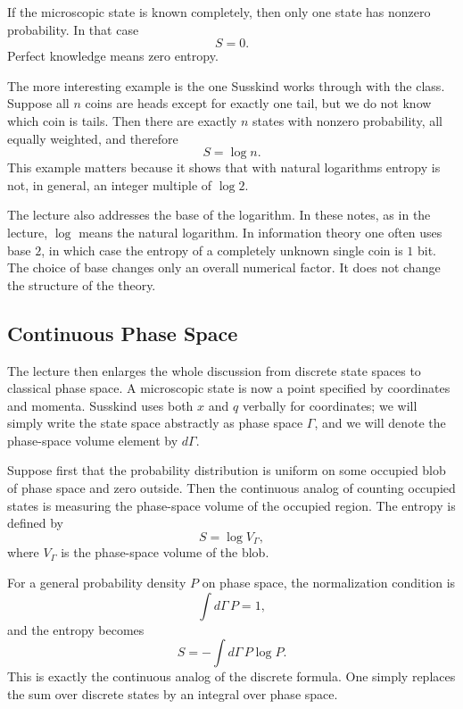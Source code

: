 If the microscopic state is known completely, then only one state has nonzero probability. In that case
\begin{equation}
S=0.
\end{equation}
Perfect knowledge means zero entropy.

The more interesting example is the one Susskind works through with the class. Suppose all \(n\) coins are heads except for exactly one tail, but we do not know which coin is tails. Then there are exactly \(n\) states with nonzero probability, all equally weighted, and therefore
\begin{equation}
S=\log n.
\end{equation}
This example matters because it shows that with natural logarithms entropy is not, in general, an integer multiple of \(\log 2\).

The lecture also addresses the base of the logarithm. In these notes, as in the lecture, \(\log\) means the natural logarithm. In information theory one often uses base \(2\), in which case the entropy of a completely unknown single coin is \(1\) bit. The choice of base changes only an overall numerical factor. It does not change the structure of the theory.

\subsection{Continuous Phase Space}

The lecture then enlarges the whole discussion from discrete state spaces to classical phase space. A microscopic state is now a point specified by coordinates and momenta. Susskind uses both \(x\) and \(q\) verbally for coordinates; we will simply write the state space abstractly as phase space \(\Gamma\), and we will denote the phase-space volume element by \(d\Gamma\).

Suppose first that the probability distribution is uniform on some occupied blob of phase space and zero outside. Then the continuous analog of counting occupied states is measuring the phase-space volume of the occupied region. The entropy is defined by
\begin{equation}
S=\log V_{\Gamma},
\end{equation}
where \(V_{\Gamma}\) is the phase-space volume of the blob.

For a general probability density \(P\) on phase space, the normalization condition is
\begin{equation}
\int d\Gamma\,P = 1,
\end{equation}
and the entropy becomes
\begin{equation}
S=-\int d\Gamma\,P\log P.
\end{equation}
This is exactly the continuous analog of the discrete formula. One simply replaces the sum over discrete states by an integral over phase space.

